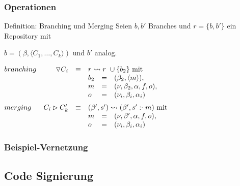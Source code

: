 \documentclass[german]{beamer}
\begin{document}
\begin{frame}
  \frametitle{Operationen}

  \begin{block}{Definition: Branching und Merging}
    \medskip
    Seien $b, b'$ Branches und $r=\{b, b'\}$ ein Repository mit

    $b=(\beta, \langle C_1, \ldots, C_k\rangle)$ und $b'$ analog.
    \medskip

    $\begin{array}{@{}lrcl}
    \STRUCT{branching}    & \triangledown C_i          & \equiv &
    r \leadsto r\ \cup \{b_2\}\ \NORMAL{mit} \\
                          &                            &        &
                          \begin{array}{@{}lcl}
                          b_2 &=& (\beta_2, \langle m\rangle), \\
                          m   &=& (\nu, \beta_2, \alpha, f, o), \\
                          o   &=& (\nu_i, \beta_i, \alpha_i) \\
                          \end{array} \medskip \\
    \STRUCT{merging}      & C_i \rhd C_k'              & \equiv &
    (\beta', s') \leadsto
    (\beta', s'\APPEND m)\ \NORMAL{mit} \\
                          &                            &        &
                          \begin{array}{@{}lcl}
                          m   &=& (\nu, \beta', \alpha, f, o), \\
                          o   &=& (\nu_i, \beta_i, \alpha_i) \\
                          \end{array} \\
    \end{array}$
  \end{block}
  
\end{frame}

\begin{frame}
  \frametitle{Beispiel-Vernetzung}

\end{frame}

\subsection{Code Signierung}
\end{document}
